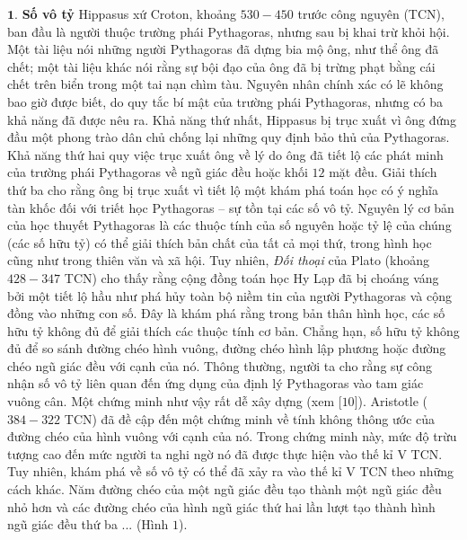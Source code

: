 \begin{multicols}{2}
	$\pmb{1.}$ \textbf{\color{lichsutoanhoc}Số vô tỷ}
	\vskip 0.05cm
	Hippasus xứ Croton, khoảng $530-450$ trước công nguyên (TCN), ban đầu là người thuộc trường phái Pythagoras, nhưng sau bị khai trừ khỏi hội. Một tài liệu nói những người Pythagoras đã dựng bia mộ ông, như thể ông đã chết; một tài liệu khác nói rằng sự bội đạo của ông đã bị trừng phạt bằng cái chết trên biển trong một tai nạn chìm tàu. Nguyên nhân chính xác có lẽ không bao giờ được biết, do quy tắc bí mật của trường phái Pythagoras, nhưng có ba khả năng đã được nêu ra. 
	\vskip 0.05cm
	Khả năng thứ nhất, Hippasus bị trục xuất vì ông đứng đầu một phong trào dân chủ chống lại những quy định bảo thủ của Pythagoras.
	\vskip 0.05cm
	Khả năng thứ hai quy việc trục xuất ông về lý do ông đã tiết lộ các phát minh của trường phái Pythagoras về ngũ giác đều hoặc khối $12$ mặt đều. 
	\vskip 0.05cm
	Giải thích thứ ba cho rằng ông bị trục xuất vì tiết lộ một khám phá toán học có ý nghĩa tàn khốc đối với triết học Pythagoras -- sự tồn tại các số vô tỷ.
	\vskip 0.1cm
	Nguyên lý cơ bản của học thuyết Pythagoras là các thuộc tính của số nguyên hoặc tỷ lệ của chúng (các số hữu tỷ) có thể giải thích bản chất của tất cả mọi thứ, trong hình học cũng như trong thiên văn và xã hội. Tuy nhiên, \textit{Đối thoại} của Plato (khoảng $428-347$ TCN) cho thấy rằng cộng đồng toán học Hy Lạp đã bị choáng váng bởi một tiết lộ hầu như phá hủy toàn bộ niềm tin của người Pythagoras và cộng đồng vào những con số. Đây là khám phá rằng trong bản  thân hình học, các số hữu tỷ không đủ để giải thích các thuộc tính cơ bản. Chẳng hạn, số hữu tỷ không đủ để so sánh đường chéo hình vuông, đường chéo hình lập phương hoặc đường chéo ngũ giác đều với cạnh của nó. 
	\vskip 0.1cm
	Thông thường, người ta cho rằng sự công nhận số vô tỷ liên quan đến ứng dụng của định lý Pythagoras vào tam giác vuông cân. Một chứng minh như vậy rất dễ xây dựng (xem [$10$]). Aristotle ($384-322$ TCN) đã đề cập đến một chứng minh về tính không thông ước của đường chéo của hình vuông với cạnh của nó. Trong chứng minh này, mức độ trừu tượng cao đến mức người ta nghi ngờ nó đã được thực hiện vào thế kỉ V TCN. Tuy nhiên,  khám phá về số vô tỷ có thể đã xảy ra vào thế kỉ V TCN theo những cách khác. 
	\vskip 0.1cm
	Năm đường chéo của một ngũ giác đều tạo thành một ngũ giác đều nhỏ hơn và các đường chéo của hình ngũ giác thứ hai lần lượt tạo thành hình ngũ giác đều thứ ba ... (Hình $1$).
	\begin{figure}[H]
		\vspace*{-5pt}
		\centering

\end{figure}
\end{multicols}
